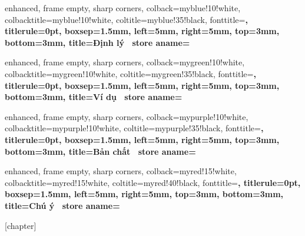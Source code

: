   {
    enhanced, frame empty, sharp corners,
    colback=myblue!10!white, colbacktitle=myblue!10!white,
    coltitle=myblue!35!black, fonttitle=\sffamily\bfseries,
    titlerule=0pt,
    boxsep=1.5mm, left=5mm, right=5mm, top=3mm, bottom=3mm,
    title={\hspace{0.5em}Định lý~\thetcbcounter{}}
    store aname={\kvtcb@label}
  }
  {}

  {
    enhanced, frame empty, sharp corners,
    colback=mygreen!10!white, colbacktitle=mygreen!10!white,
    coltitle=mygreen!35!black, fonttitle=\sffamily\bfseries,
    titlerule=0pt,
    boxsep=1.5mm, left=5mm, right=5mm, top=3mm, bottom=3mm,
    title={\hspace{0.5em}Ví dụ~\thetcbcounter{}}
    store aname={\kvtcb@label}
  }
  {}

  {
    enhanced, frame empty, sharp corners,
    colback=mypurple!10!white, colbacktitle=mypurple!10!white,
    coltitle=mypurple!35!black, fonttitle=\sffamily\bfseries,
    titlerule=0pt,
    boxsep=1.5mm, left=5mm, right=5mm, top=3mm, bottom=3mm,
    title={\hspace{0.5em}Bản chất~\thetcbcounter{}}
    store aname={\kvtcb@label}
  }
  {}

  {
    enhanced, frame empty, sharp corners,
    colback=myred!15!white, colbacktitle=myred!15!white,
    coltitle=myred!40!black, fonttitle=\sffamily\bfseries,
    titlerule=0pt,
    boxsep=1.5mm, left=5mm, right=5mm, top=3mm, bottom=3mm,
    title={\hspace{0.5em}Chú ý~\thetcbcounter{}}
    store aname={\kvtcb@label}
  }
  {}



[chapter]
\renewcommand{\thecauhoicounter}{\thechapter.\arabic{cauhoicounter}}

